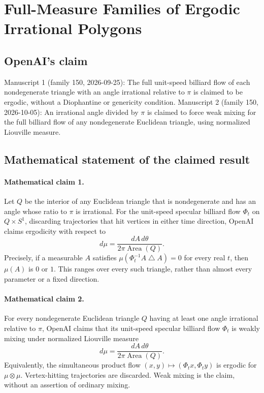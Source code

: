 \documentclass[11pt]{article}
\begin{document}
\section*{Full-Measure Families of Ergodic Irrational Polygons}

\subsection{OpenAI's claim}
Manuscript 1 (family 150, 2026-09-25): The full unit-speed billiard flow of each nondegenerate triangle with an angle irrational relative to $\pi$ is claimed to be ergodic, without a Diophantine or genericity condition. Manuscript 2 (family 150, 2026-10-05): An irrational angle divided by $\pi$ is claimed to force weak mixing for the full billiard flow of any nondegenerate Euclidean triangle, using normalized Liouville measure.

\subsection{Mathematical statement of the claimed result}
\paragraph{Mathematical claim 1.} Let $Q$ be the interior of any Euclidean triangle that is nondegenerate and has an angle whose ratio to $\pi$ is irrational. For the unit-speed specular billiard flow $\Phi_t$ on $Q\times S^1$, discarding trajectories that hit vertices in either time direction, OpenAI claims ergodicity with respect to
\[
d\mu=\frac{dA\,d\theta}{2\pi\operatorname{Area}(Q)}.
\]
Precisely, if a measurable $A$ satisfies $\mu(\Phi_t^{-1}A\mathbin{\triangle} A)=0$ for every real $t$, then $\mu(A)$ is $0$ or $1$. This ranges over every such triangle, rather than almost every parameter or a fixed direction.

\paragraph{Mathematical claim 2.} For every nondegenerate Euclidean triangle $Q$ having at least one angle irrational relative to $\pi$, OpenAI claims that its unit-speed specular billiard flow $\Phi_t$ is weakly mixing under normalized Liouville measure
\[
d\mu=\frac{dA\,d\theta}{2\pi\operatorname{Area}(Q)}.
\]
Equivalently, the simultaneous product flow $(x,y)\mapsto(\Phi_tx,\Phi_ty)$ is ergodic for $\mu\otimes\mu$. Vertex-hitting trajectories are discarded. Weak mixing is the claim, without an assertion of ordinary mixing.
\end{document}
